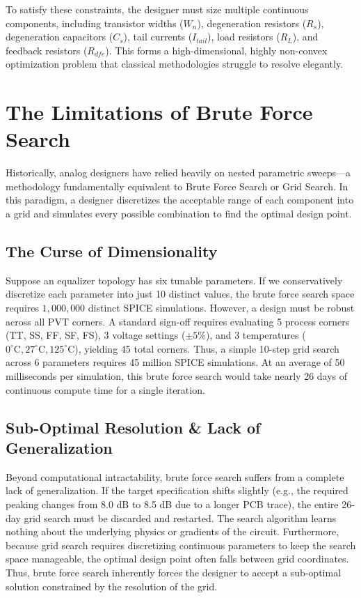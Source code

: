 \documentclass[11pt, a4paper]{article}
\begin{document}
To satisfy these constraints, the designer must size multiple continuous components, including transistor widths ($W_n$), degeneration resistors ($R_s$), degeneration capacitors ($C_s$), tail currents ($I_{tail}$), load resistors ($R_L$), and feedback resistors ($R_{dfe}$). This forms a high-dimensional, highly non-convex optimization problem that classical methodologies struggle to resolve elegantly.

\section{The Limitations of Brute Force Search}
Historically, analog designers have relied heavily on nested parametric sweeps---a methodology fundamentally equivalent to Brute Force Search or Grid Search. In this paradigm, a designer discretizes the acceptable range of each component into a grid and simulates every possible combination to find the optimal design point.

\subsection*{The Curse of Dimensionality}
Suppose an equalizer topology has six tunable parameters. If we conservatively discretize each parameter into just 10 distinct values, the brute force search space requires $1,000,000$ distinct SPICE simulations. However, a design must be robust across all PVT corners. A standard sign-off requires evaluating 5 process corners (TT, SS, FF, SF, FS), 3 voltage settings ($\pm 5\%$), and 3 temperatures ($0^\circ \text{C}, 27^\circ \text{C}, 125^\circ \text{C}$), yielding 45 total corners. Thus, a simple 10-step grid search across 6 parameters requires 45 million SPICE simulations. At an average of 50 milliseconds per simulation, this brute force search would take nearly 26 days of continuous compute time for a single iteration.

\subsection*{Sub-Optimal Resolution \& Lack of Generalization}
Beyond computational intractability, brute force search suffers from a complete lack of generalization. If the target specification shifts slightly (e.g., the required peaking changes from 8.0 dB to 8.5 dB due to a longer PCB trace), the entire 26-day grid search must be discarded and restarted. The search algorithm learns nothing about the underlying physics or gradients of the circuit. Furthermore, because grid search requires discretizing continuous parameters to keep the search space manageable, the optimal design point often falls between grid coordinates. Thus, brute force search inherently forces the designer to accept a sub-optimal solution constrained by the resolution of the grid.
\end{document}
